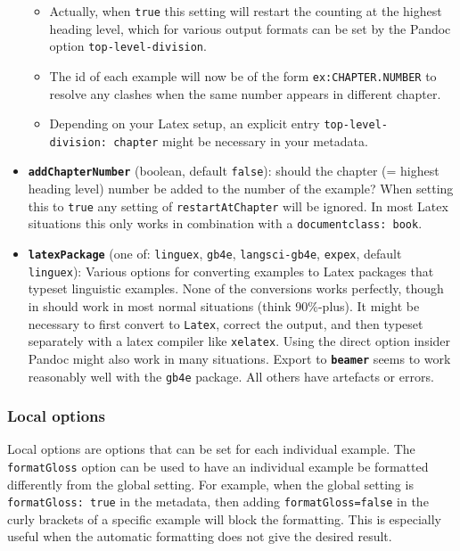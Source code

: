 \documentclass[
]{article}
\providecommand{\tightlist}{%
  \setlength{\itemsep}{0pt}\setlength{\parskip}{0pt}}
\begin{document}
\begin{itemize}
  \begin{itemize}
  \tightlist
  \item
    Actually, when \texttt{true} this setting will restart the counting
    at the highest heading level, which for various output formats can
    be set by the Pandoc option \texttt{top-level-division}.
  \item
    The id of each example will now be of the form
    \texttt{ex:CHAPTER.NUMBER} to resolve any clashes when the same
    number appears in different chapter.
  \item
    Depending on your Latex setup, an explicit entry
    \texttt{top-level-division:\ chapter} might be necessary in your
    metadata.
  \end{itemize}
\item
  \textbf{\texttt{addChapterNumber}} (boolean, default \texttt{false}):
  should the chapter (= highest heading level) number be added to the
  number of the example? When setting this to \texttt{true} any setting
  of \texttt{restartAtChapter} will be ignored. In most Latex situations
  this only works in combination with a \texttt{documentclass:\ book}.
\item
  \textbf{\texttt{latexPackage}} (one of: \texttt{linguex},
  \texttt{gb4e}, \texttt{langsci-gb4e}, \texttt{expex}, default
  \texttt{linguex}): Various options for converting examples to Latex
  packages that typeset linguistic examples. None of the conversions
  works perfectly, though in should work in most normal situations
  (think 90\%-plus). It might be necessary to first convert to
  \texttt{Latex}, correct the output, and then typeset separately with a
  latex compiler like \texttt{xelatex}. Using the direct option insider
  Pandoc might also work in many situations. Export to
  \textbf{\texttt{beamer}} seems to work reasonably well with the
  \texttt{gb4e} package. All others have artefacts or errors.
\end{itemize}

\hypertarget{local-options}{%
\subsubsection{Local options}\label{local-options}}

Local options are options that can be set for each individual example.
The \texttt{formatGloss} option can be used to have an individual
example be formatted differently from the global setting. For example,
when the global setting is \texttt{formatGloss:\ true} in the metadata,
then adding \texttt{formatGloss=false} in the curly brackets of a
specific example will block the formatting. This is especially useful
when the automatic formatting does not give the desired result.
\end{document}
